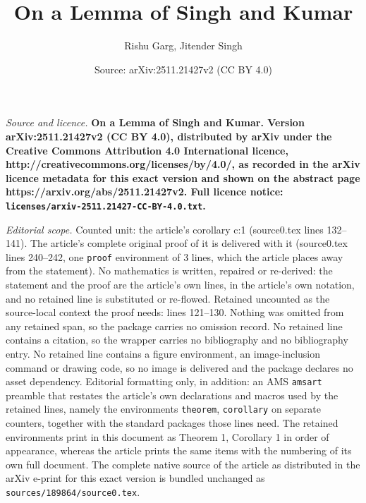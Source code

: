 \documentclass[10pt,a4paper]{amsart}
\title{\bf On a Lemma of Singh and Kumar}
\author{Rishu Garg, Jitender Singh}
\date{Source: arXiv:2511.21427v2 (CC BY 4.0)}
\begin{document}
\maketitle

\noindent\emph{Source and licence.} \bf On a Lemma of Singh and Kumar. Version arXiv:2511.21427v2 (CC BY 4.0), distributed by arXiv under the Creative Commons Attribution 4.0 International licence, http://creativecommons.org/licenses/by/4.0/, as recorded in the arXiv licence metadata for this exact version and shown on the abstract page https://arxiv.org/abs/2511.21427v2. Full licence notice: \texttt{licenses/arxiv-2511.21427-CC-BY-4.0.txt}.\par\smallskip

\noindent\textit{Editorial scope.} Counted unit: the article's corollary c:1 (source0.tex lines 132--141). The article's complete original proof of it is delivered with it (source0.tex lines 240--242, one \texttt{proof} environment of 3 lines, which the article places away from the statement). No mathematics is written, repaired or re-derived: the statement and the proof are the article's own lines, in the article's own notation, and no retained line is substituted or re-flowed.  Retained uncounted as the source-local context the proof needs: lines 121--130.  Nothing was omitted from any retained span, so the package carries no omission record.  No retained line contains a citation, so the wrapper carries no bibliography and no bibliography entry.  No retained line contains a figure environment, an image-inclusion command or drawing code, so no image is delivered and the package declares no asset dependency.  Editorial formatting only, in addition: an AMS \texttt{amsart} preamble that restates the article's own declarations and macros used by the retained lines, namely the environments \texttt{theorem}, \texttt{corollary} on separate counters, together with the standard packages those lines need.  The retained environments print in this document as Theorem 1, Corollary 1 in order of appearance, whereas the article prints the same items with the numbering of its own full document.  The complete native source of the article as distributed in the arXiv e-print for this exact version is bundled unchanged as \texttt{sources/189864/source0.tex}.
\end{document}
